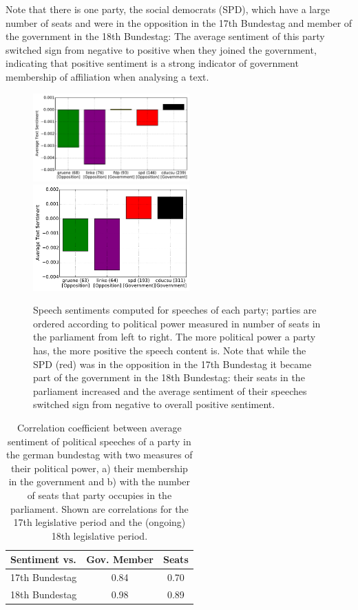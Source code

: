 \documentclass[runningheads,a4paper]{llncs}
\begin{document}
Note that there is one party, the social democrats (SPD), which have a large number of seats and were in the opposition in the 17th Bundestag and member of the government in the 18th Bundestag: The average sentiment of this party switched sign from negative to positive when they joined the government, indicating that positive sentiment is a strong indicator of government membership of affiliation when analysing a text. 

\begin{figure}
\begin{center}
\includegraphics[width=6cm]{images/party-sentiments-17.pdf}  \hfill \includegraphics[width=6cm]{images/party-sentiments-18.pdf} 
%
\end{center}
\caption{
\label{fig:party_sentiments}
Speech sentiments computed for speeches of each party; parties are ordered according to political power measured in number of seats in the parliament from left to right. The more political power a party has, the more positive the speech content is. Note that while the SPD (red) was in the opposition in the 17th Bundestag it became part of the government in the 18th Bundestag: their seats in the parliament increased and the average sentiment of their speeches switched sign from negative to overall positive sentiment.
}
\end{figure}

\begin{table}[t]
\begin{center}
\begin{tabular}{lcc}
   Sentiment vs. &          Gov. Member    &  Seats\\
\hline\hline
17th Bundestag    &  0.84 & 0.70\\
18th Bundestag   &  0.98 & 0.89\\
%
\end{tabular}
\end{center}
\caption{
\label{tab:sentiments}
Correlation coefficient between average sentiment of political speeches of a party in the german bundestag with two measures of their political power, a) their membership in the government and b) with the number of seats that party occupies in the parliament. Shown are correlations for the 17th legislative period and the (ongoing) 18th legislative period.
}
\end{table}
\end{document}
